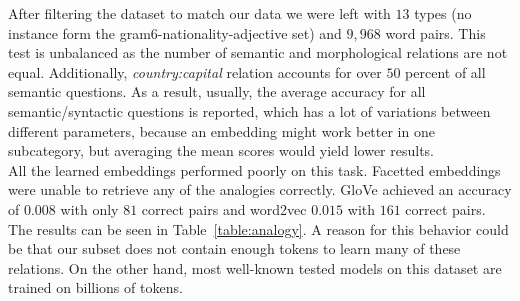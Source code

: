 \begin{table}[h]
  \centering
  {%
  }
  \caption{The accuracy results on Mikolove's test set with $9,968$ word pairs.}
  \label{table:analogy}
\end{table}

\noindent
After filtering the dataset to match our data we were left with $13$ types (no instance form the  gram6-nationality-adjective set) and $9,968$ word pairs. This test is unbalanced as the number of semantic and morphological relations are not equal. Additionally, \emph{country:capital} relation accounts for over $50$ percent of all semantic questions. As a result, usually, the average accuracy for all semantic/syntactic questions is reported, which has a lot of variations between different parameters, because an embedding might work better in one subcategory, but averaging the mean scores would yield lower results.\\
All the learned embeddings performed poorly on this task. Facetted embeddings were unable to retrieve any of the analogies correctly. GloVe achieved an accuracy of $0.008$ with only $81$ correct pairs and word2vec $0.015$ with $161$ correct pairs. The results can be seen in Table~\ref{table:analogy}. A reason for this behavior could be that our subset does not contain enough tokens to learn many of these relations. On the other hand, most well-known tested models on this dataset are trained on billions of tokens. 
